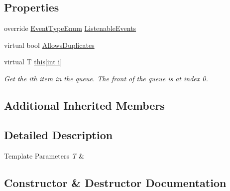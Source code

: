 \subsection*{Properties}
\begin{DoxyCompactItemize}
\item 
override \hyperlink{namespace_c5_a9143bfd561fffa025d21561674758008}{Event\+Type\+Enum} \hyperlink{class_c5_1_1_circular_queue_a2dc39118f0d30f1bae7d3a73d4d2e4c6}{Listenable\+Events}
\item 
virtual bool \hyperlink{class_c5_1_1_circular_queue_a0146f541106c3d6cf4259a1a6fe61d9c}{Allows\+Duplicates}
\item 
virtual T \hyperlink{class_c5_1_1_circular_queue_a26b24b8ca3560860d09710dc8e8409bb}{this\mbox{[}int i\mbox{]}}
\begin{DoxyCompactList}\small\item\em Get the i\textquotesingle{}th item in the queue. The front of the queue is at index 0. \end{DoxyCompactList}\end{DoxyCompactItemize}
\subsection*{Additional Inherited Members}


\subsection{Detailed Description}



\begin{DoxyTemplParams}{Template Parameters}
{\em T} & \\
\hline
\end{DoxyTemplParams}


\subsection{Constructor \& Destructor Documentation}
\hypertarget{class_c5_1_1_circular_queue_a8b23dc95a35d343c2d6a745ebb812090}{}
